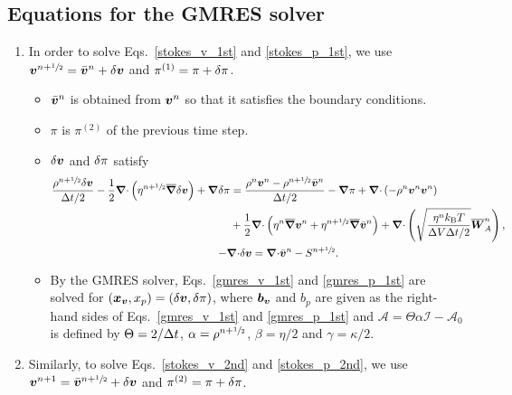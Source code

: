 \documentclass[
10pt
showpacs, showkeys,
amsmath,amssymb,
aps,
pre,
floatfix,
]{revtex4-1}
\newcommand{\divg}{{\V\nabla\cdot}}                       %
\newcommand{\paren}[1]{{(#1)}}                            %
\begin{document}
\subsection{Equations for the GMRES solver}

\begin{enumerate}

\item In order to solve Eqs.~\eqref{stokes_v_1st} and \eqref{stokes_p_1st}, we use $\boldsymbol{v}^{n+\sfrac{1}{2}}=\bar{\boldsymbol{v}}^n+\delta\boldsymbol{v}$ and $\pi^\paren{1}=\pi+\d{\pi}$.

\begin{itemize}
\item $\bar{\boldsymbol{v}}^n$ is obtained from $\boldsymbol{v}^n$ so that it satisfies the boundary conditions.
\item $\pi$ is $\pi^\paren{2}$ of the previous time step.
\item $\delta\boldsymbol{v}$ and $\delta\pi$ satisfy
\begin{gather}
\label{gmres_v_1st}
\begin{split}
\frac{\rho^{n+\myhalf}\d{\V{v}}}{\D{t}/2} - \frac{1}{2}\divg\left(\eta^{n+\myhalf}\overline{\grad}\d{\V{v}}\right) + \grad\d{\pi}
& = \frac{\rho^n\V{v}^n-\rho^{n+\myhalf}\bar{\V{v}}^n}{\D{t}/2} - \grad\pi 
+ \divg\left(-\rho^n\V{v}^n\V{v}^n\right) \\
& + \frac{1}{2}\divg\left( \eta^n \overline{\grad}\V{v}^n + \eta^{n+\myhalf} \overline{\grad}\bar{\V{v}}^n \right)
+ \divg\left( \sqrt{\frac{\eta^n k_\mathrm{B}T}{\D{V}\D{t}/2} } \overline{\V{W}}^n_A \right),
\end{split} \\
\label{gmres_p_1st}
-\divg\d{\V{v}} = \divg\bar{\V{v}}^n-S^{n+\myhalf}.
\end{gather}
\item By the GMRES solver, Eqs.~\eqref{gmres_v_1st} and \eqref{gmres_p_1st} are solved for $(\boldsymbol{x}_{\boldsymbol{v}},x_p)=(\delta\boldsymbol{v},\delta\pi)$, where $\boldsymbol{b}_{\boldsymbol{v}}$ and $b_p$ are given as the right-hand sides of Eqs.~\eqref{gmres_v_1st} and \eqref{gmres_p_1st} and 
$\mathcal{A}=\Theta\alpha\mathcal{I}-\mathcal{A}_0$ is defined by $\Theta=2/\Delta t$, $\alpha=\rho^{n+\sfrac{1}{2}}$, $\beta=\eta/2$ and $\gamma=\kappa/2$.
\end{itemize}

\item Similarly, to solve Eqs.~\eqref{stokes_v_2nd} and \eqref{stokes_p_2nd}, we use $\boldsymbol{v}^{n+1}=\bar{\boldsymbol{v}}^{n+\sfrac{1}{2}}+\delta\boldsymbol{v}$ and $\pi^\paren{2}=\pi+\d{\pi}$.


\end{enumerate}
\end{document}
